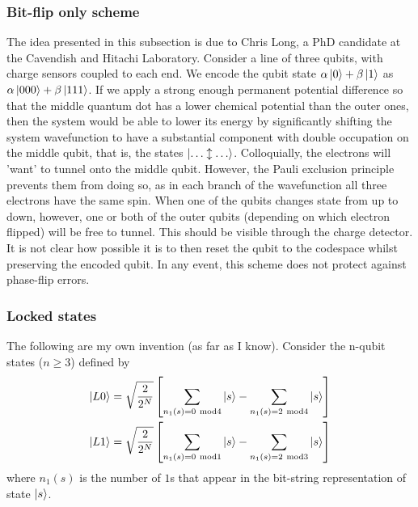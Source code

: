 \documentclass{report}
\begin{document}
\begin{appendices}
\subsubsection{Bit-flip only scheme}
The idea presented in this subsection is due to Chris Long, a PhD candidate at the Cavendish and Hitachi Laboratory.
Consider a line of three qubits, with charge sensors coupled to each end. We encode the qubit state $\alpha \ket{0} + \beta\ket{1}$ as $\alpha \ket{000} + \beta\ket{111}$. If we apply a strong enough permanent potential difference so that the middle quantum dot has a lower chemical potential than the outer ones, then the system would be able to lower its energy by significantly shifting the system wavefunction to have a substantial component with double occupation on the middle qubit, that is, the states $\ket{\dots \updownarrow \dots}$. Colloquially, the electrons will 'want' to tunnel onto the middle qubit. However, the Pauli exclusion principle prevents them from doing so, as in each branch of the wavefunction all three electrons have the same spin. When one of the qubits changes state from up to down, however, one or both of the outer qubits (depending on which electron flipped) will be free to tunnel. This should be visible through the charge detector. It is not clear how possible it is to then reset the qubit to the codespace whilst preserving the encoded qubit. In any event, this scheme does not protect against phase-flip errors.
\subsubsection{Locked states}
The following are my own invention (as far as I know). Consider the n-qubit states ($n \ge 3$) defined by
\begin{align*}
    \ket{L0} &= \sqrt{\frac{2}{2^N}}\left[\sum_{n_1(s) = 0\mathrm{\ mod}4}{\ket{s}} - \sum_{n_1(s) = 2\mathrm{\ mod}4}{\ket{s}}\right] \\
    \ket{L1} &= \sqrt{\frac{2}{2^N}}\left[\sum_{n_1(s) = 0\mathrm{\ mod}1}{\ket{s}} - \sum_{n_1(s) = 2\mathrm{\ mod}3}{\ket{s}}\right]
\end{align*} where $n_1(s)$ is the number of $1$s that appear in the bit-string representation of state $\ket{s}$.


\end{appendices}
\end{document}
